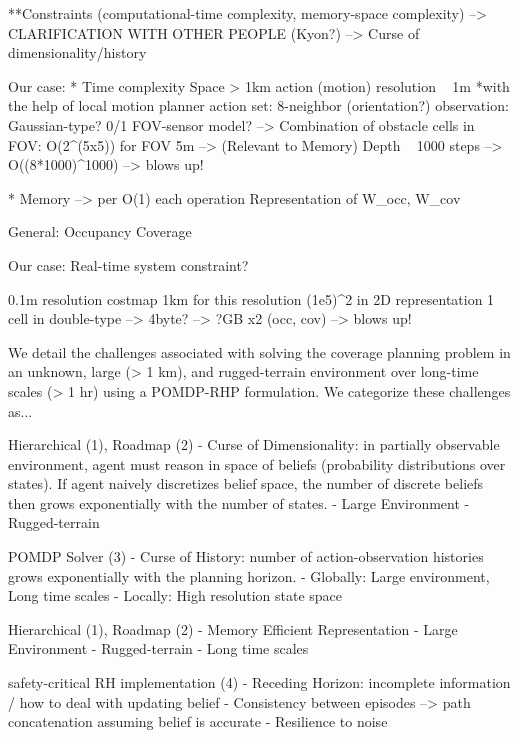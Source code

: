 \documentclass[letterpaper]{article} %
\begin{document}
**Constraints (computational-time complexity, memory-space complexity) --> CLARIFICATION WITH OTHER PEOPLE (Kyon?)
--> Curse of dimensionality/history

Our case:
* Time complexity
Space > 1km
action (motion) resolution ~ 1m  *with the help of local motion planner
action set: 8-neighbor (orientation?)
observation: Gaussian-type? 0/1 FOV-sensor model? --> Combination of obstacle cells in FOV: O(2^(5x5)) for FOV 5m --> (Relevant to Memory)
Depth ~ 1000 steps
--> O((8*1000)^1000) --> blows up!



* Memory --> per O(1) each operation %
Representation of W_occ, W_cov

General:
Occupancy %
Coverage %

Our case:
Real-time system constraint?

0.1m resolution costmap
1km for this resolution
(1e5)^2 in 2D representation
1 cell in double-type --> 4byte? --> ?GB x2 (occ, cov) --> blows up!




We detail the challenges associated with solving the coverage planning problem in an unknown, large (> 1 km), and rugged-terrain environment over long-time scales (> 1 hr) using a POMDP-RHP formulation. We categorize these challenges as...

Hierarchical (1), Roadmap (2)
- Curse of Dimensionality: in partially observable environment, agent must reason in space of beliefs (probability distributions over states). If agent naively discretizes belief space, the number of discrete beliefs then grows exponentially with the number of states.
    - Large Environment
    - Rugged-terrain

POMDP Solver (3)
- Curse of History: number of action-observation histories grows exponentially with the planning horizon.
    - Globally: Large environment, Long time scales
    - Locally: High resolution state space

Hierarchical (1), Roadmap (2)
- Memory Efficient Representation
    - Large Environment
    - Rugged-terrain
    - Long time scales

safety-critical RH implementation (4)
- Receding Horizon: incomplete information / how to deal with updating belief
    - Consistency between episodes --> path concatenation assuming belief is accurate
    - Resilience to noise
    
\end{document}
